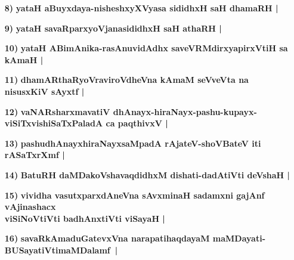 \begin{itemize}
\item [\bf 8)] {\bf yataH aBuyxdaya-nisheshxyXVyasa sididhxH saH dhamaRH |}\label{94}
\item [\bf 9)] {\bf yataH savaRparxyoVjanasididhxH saH athaRH |}\label{94}
\item [\bf 10)] {\bf yataH ABimAnika-rasAnuvidAdhx saveVRMdirxyapirxVtiH sa kAmaH |}\label{94}
\item [\bf 11)] {\bf dhamARthaRyoVraviroVdheVna kAmaM seVveVta na nisusxKiV sAyxtf |}\label{95}
\item [\bf 12)] {\bf vaNARsharxmavatiV dhAnayx-hiraNayx-pashu-kupayx-viSiTxvishiSaTxPaladA ca paqthivxV |}\label{95}
\item [\bf 13)] {\bf pashudhAnayxhiraNayxsaMpadA rAjateV-shoVBateV iti rASaTxrXmf |}\label{95}
\item [\bf 14)] {\bf BatuRH daMDakoVshavaqdidhxM dishati-dadAtiVti deVshaH |}\label{95}
\item [\bf 15)] {\bf vividha vasutxparxdAneVna sAvxminaH sadamxni gajAnf vAjinashacx}\\ {\bf viSiNoVtiVti badhAnxtiVti viSayaH |}
\item [\bf 16)] {\bf savaRkAmaduGatevxVna narapatihaqdayaM maMDayati-BUSayatiVti\break maMDalamf~|}\label{95}


\end{itemize}
